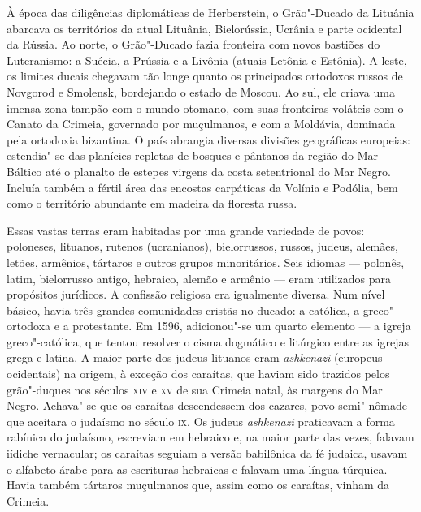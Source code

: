 À época das diligências diplomáticas de Herberstein, o Grão"-Ducado da
Lituânia abarcava os territórios da atual Lituânia, Bielorússia, Ucrânia
e parte ocidental da Rússia. Ao norte, o Grão"-Ducado fazia fronteira com
novos bastiões do Luteranismo: a Suécia, a Prússia e a Livônia (atuais
Letônia e Estônia). A leste, os limites ducais chegavam tão longe quanto
os principados ortodoxos russos de Novgorod e Smolensk, bordejando o
estado de Moscou. Ao sul, ele criava uma imensa zona tampão com o mundo
otomano, com suas fronteiras voláteis com o Canato da Crimeia, governado
por muçulmanos, e com a Moldávia, dominada pela ortodoxia bizantina. O
país abrangia diversas divisões geográficas europeias: estendia"-se das
planícies repletas de bosques e pântanos da região do Mar Báltico até o
planalto de estepes virgens da costa setentrional do Mar Negro. Incluía
também a fértil área das encostas carpáticas da Volínia e Podólia, bem
como o território abundante em madeira da floresta russa.

Essas vastas terras eram habitadas por uma grande variedade de povos:
poloneses, lituanos, rutenos (ucranianos), bielorrussos, russos, judeus,
alemães, letões, armênios, tártaros e outros grupos minoritários. Seis
idiomas --- polonês, latim, bielorrusso antigo, hebraico, alemão e armênio ---
eram utilizados para propósitos jurídicos. A confissão religiosa era
igualmente diversa. Num nível básico, havia três grandes comunidades
cristãs no ducado: a católica, a greco"-ortodoxa e a protestante. Em
1596, adicionou"-se um quarto elemento --- a igreja greco"-católica, que
tentou resolver o cisma dogmático e litúrgico entre as igrejas grega e
latina. A maior parte dos judeus lituanos eram \textit{ashkenazi} (europeus
ocidentais) na origem, à exceção dos caraítas, que haviam sido trazidos
pelos grão"-duques nos séculos \textsc{xiv} e \textsc{xv} de sua Crimeia natal, às margens
do Mar Negro. Achava"-se que os caraítas descendessem dos cazares, povo
semi"-nômade que aceitara o judaísmo no século \textsc{ix}. Os judeus \textit{ashkenazi}
praticavam a forma rabínica do judaísmo, escreviam em hebraico e, na
maior parte das vezes, falavam iídiche vernacular; os caraítas seguiam a
versão babilônica da fé judaica, usavam o alfabeto árabe para as
escrituras hebraicas e falavam uma língua túrquica. Havia também
tártaros muçulmanos que, assim como os caraítas, vinham da Crimeia.

